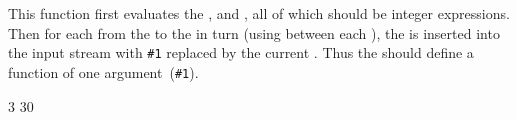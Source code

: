 \documentclass[oneside]{book}
\begin{document}

\begin{function}{\intStepInline}
\begin{syntax}
    
\end{syntax}
This function first evaluates the , 
and , all of which should be integer expressions.
Then for each  from the  to the
 in turn (using  between each
), the  is inserted into the input stream
with \verb|#1| replaced by the current . Thus the
 should define a function of one argument~(\verb|#1|).
\begin{demohigh}
\IgnoreSpacesOn
\tlClear \lTmpaTl
{} {3} {30} {
  \tlPutRight \lTmpaTl {[#1]}
}
\tlUse \lTmpaTl
\IgnoreSpacesOff
\end{demohigh}
\end{function}
\end{document}
